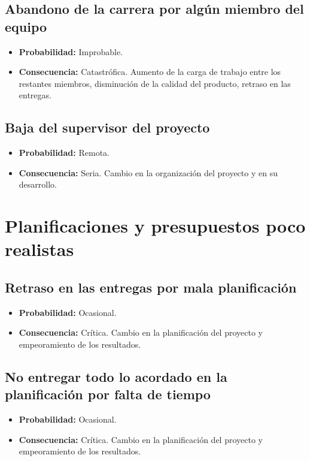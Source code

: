 \documentclass[spanish,a4paper,12pt]{report}	%
\begin{document}
\subsection*{Abandono de la carrera por algún miembro del equipo}
	\begin{itemize}
		\item \textbf {Probabilidad: }Improbable.
		\item \textbf {Consecuencia: }Catastrófica. Aumento de la carga de trabajo entre los restantes miembros, disminución de la calidad del producto, retraso en las entregas.
	\end{itemize}

\subsection*{Baja del supervisor del proyecto}
	\begin{itemize}
		\item \textbf {Probabilidad: }Remota.
		\item \textbf {Consecuencia: }Seria. Cambio en la organización del proyecto y en su desarrollo.
	\end{itemize}

%
\section{Planificaciones y presupuestos poco realistas}

\subsection*{Retraso en las entregas por mala planificación}
	\begin{itemize}
		\item \textbf {Probabilidad: }Ocasional.
		\item \textbf {Consecuencia: }Crítica. Cambio en la planificación del proyecto y empeoramiento de los resultados.
	\end{itemize}

\subsection*{No entregar todo lo acordado en la planificación por falta de tiempo}
	\begin{itemize}
		\item \textbf {Probabilidad: }Ocasional.
		\item \textbf {Consecuencia: }Crítica. Cambio en la planificación del proyecto y empeoramiento de los resultados.
	\end{itemize}
\end{document}
